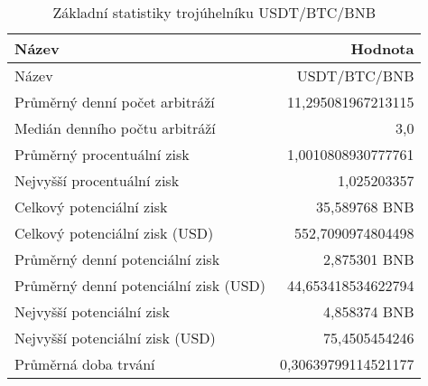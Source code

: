 \begin{table}\centering
\caption{Základní statistiky trojúhelníku USDT/BTC/BNB}
\label{USDTBTCBNB_stats}
\begin{tabular}{|| l | r ||}
\hline Název & Hodnota \\ 
\hline\hline Název & USDT/BTC/BNB \\ 
\hline Průměrný denní počet arbitráží & 11,295081967213115 \\ 
\hline Medián denního počtu arbitráží & 3,0 \\ 
\hline Průměrný procentuální zisk & 1,0010808930777761 \\ 
\hline Nejvyšší procentuální zisk & 1,025203357 \\ 
\hline Celkový potenciální zisk & 35,589768 BNB \\ 
\hline Celkový potenciální zisk (USD) & 552,7090974804498 \\ 
\hline Průměrný denní potenciální zisk & 2,875301 BNB \\ 
\hline Průměrný denní potenciální zisk (USD) & 44,653418534622794 \\ 
\hline Nejvyšší potenciální zisk & 4,858374 BNB \\ 
\hline Nejvyšší potenciální zisk (USD) & 75,4505454246 \\ 
\hline Průměrná doba trvání & 0,30639799114521177 \\ 
\hline
\end{tabular}
\end{table}
